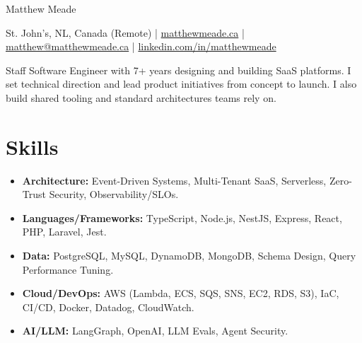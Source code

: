 \documentclass[11pt]{article}
\begin{document}
\centerline{\Huge Matthew Meade}

\vspace{5pt}

\centerline{St. John's, NL, Canada (Remote) | \href{https://matthewmeade.ca}{matthewmeade.ca} | \href{mailto:matthew@matthewmeade.ca}{matthew@matthewmeade.ca} | \href{https://linkedin.com/in/matthewmeade}{linkedin.com/in/matthewmeade}}

\vspace{8pt}

Staff Software Engineer with 7+ years designing and building SaaS platforms. I set technical direction and lead product initiatives from concept to launch. I also build shared tooling and standard architectures teams rely on.

\section*{Skills}
\begin{itemize}
    \item \textbf{Architecture:} Event-Driven Systems, Multi-Tenant SaaS, Serverless, Zero-Trust Security, Observability/SLOs.
    \item \textbf{Languages/Frameworks:} TypeScript, Node.js, NestJS, Express, React, PHP, Laravel, Jest.
    \item \textbf{Data:} PostgreSQL, MySQL, DynamoDB, MongoDB, Schema Design, Query Performance Tuning.
    \item \textbf{Cloud/DevOps:} AWS (Lambda, ECS, SQS, SNS, EC2, RDS, S3), IaC, CI/CD, Docker, Datadog, CloudWatch.
    \item \textbf{AI/LLM:} LangGraph, OpenAI, LLM Evals, Agent Security.
\end{itemize}

\end{document}
